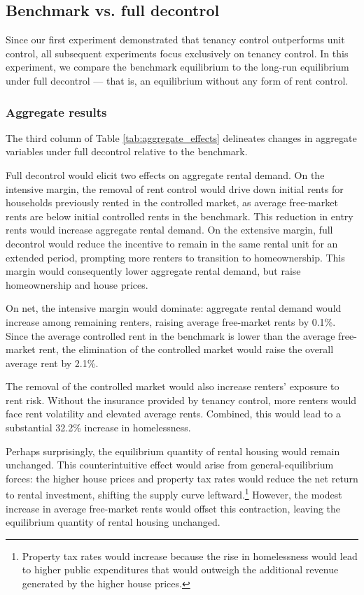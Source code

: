 \documentclass[parskip=full]{article}
\begin{document}
\subsection{Benchmark vs. full decontrol}

Since our first experiment demonstrated that tenancy control outperforms unit control, all subsequent experiments focus exclusively on tenancy control. In this experiment, we compare the benchmark equilibrium to the long-run equilibrium under full decontrol — that is, an equilibrium without any form of rent control.

\subsubsection{Aggregate results}

The third column of Table \ref{tab:aggregate_effects} delineates changes in aggregate variables under full decontrol relative to the benchmark. 

Full decontrol would elicit two effects on aggregate rental demand. On the intensive margin, the removal of rent control would drive down initial rents for households previously rented in the controlled market, as average free-market rents are below initial controlled rents in the benchmark. This reduction in entry rents would increase aggregate rental demand. On the extensive margin, full decontrol would reduce the incentive to remain in the same rental unit for an extended period, prompting more renters to transition to homeownership. This margin would consequently lower aggregate rental demand, but raise homeownership and house prices. 

On net, the intensive margin would dominate: aggregate rental demand would increase among remaining renters, raising average free-market rents by 0.1\%. Since the average controlled rent in the benchmark is lower than the average free-market rent, the elimination of the controlled market would raise the overall average rent by 2.1\%.

The removal of the controlled market would also increase renters' exposure to rent risk. Without the insurance provided by tenancy control, more renters would face rent volatility and elevated average rents. Combined, this would lead to a substantial 32.2\% increase in homelessness.

Perhaps surprisingly, the equilibrium quantity of rental housing would remain unchanged. This counterintuitive effect would arise from general-equilibrium forces: the higher house prices and property tax rates would reduce the net return to rental investment, shifting the supply curve leftward.\footnote{Property tax rates would increase because the rise in homelessness would lead to higher public expenditures that would outweigh the additional revenue generated by the higher house prices.} However, the modest increase in average free-market rents would offset this contraction, leaving the equilibrium quantity of rental housing unchanged.
\end{document}
